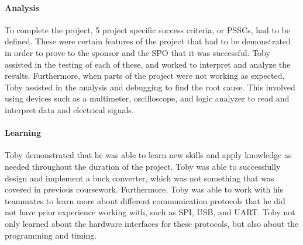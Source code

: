\documentclass[../../main.tex]{subfiles}
\begin{document}
\paragraph{Analysis}
\par To complete the project, 5 project specific success criteria, or PSSCs, had to be defined. These were certain features of the project that had to be demonstrated in order to prove to the sponsor and the SPO that it was successful. Toby assisted in the testing of each of these, and worked to interpret and analyze the results. Furthermore, when parts of the project were not working as expected, Toby assisted in the analysis and debugging to find the root cause. This involved using devices such as a multimeter, oscilloscope, and logic analyzer to read and interpret data and electrical signals. 

\paragraph{Learning}
\par Toby demonstrated that he was able to learn new skills and apply knowledge as needed throughout the duration of the project. Toby was able to successfully design and implement a buck converter, which was not something that was covered in previous coursework. Furthermore, Toby was able to work with his teammates to learn more about different communication protocols that he did not have prior experience working with, such as SPI, USB, and UART. Toby not only learned about the hardware interfaces for these protocols, but also about the programming and timing.
\end{document}
